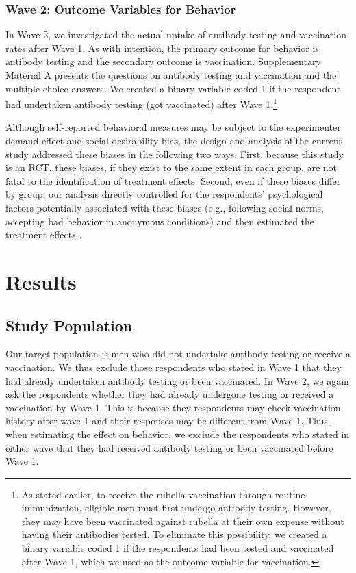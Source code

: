 \documentclass[
  11pt,
  a4paper
]{article}
\begin{document}
\hypertarget{wave2}{%
\subsubsection{Wave 2: Outcome Variables for Behavior}\label{wave2}}

In Wave 2, we investigated the actual uptake of antibody testing and vaccination rates after Wave 1. As with intention, the primary outcome for behavior is antibody testing and the secondary outcome is vaccination. Supplementary Material A presents the questions on antibody testing and vaccination and the multiple-choice answers. We created a binary variable coded 1 if the respondent had undertaken antibody testing (got vaccinated) after Wave 1.\footnote{As stated earlier, to receive the rubella vaccination through routine immunization, eligible men must first undergo antibody testing. However, they may have been vaccinated against rubella at their own expense without having their antibodies tested. To eliminate this possibility, we created a binary variable coded 1 if the respondents had been tested and vaccinated after Wave 1, which we used as the outcome variable for vaccination.}

Although self-reported behavioral measures may be subject to the experimenter demand effect and social desirability bias, the design and analysis of the current study addressed these biases in the following two ways. First, because this study is an RCT, these biases, if they exist to the same extent in each group, are not fatal to the identification of treatment effects. Second, even if these biases differ by group, our analysis directly controlled for the respondents' psychological factors potentially associated with these biases (e.g., following social norms, accepting bad behavior in anonymous conditions) and then estimated the treatment effects .

\hypertarget{results}{%
\section{Results}\label{results}}

\hypertarget{sample}{%
\subsection{Study Population}\label{sample}}

Our target population is men who did not undertake antibody testing or receive a vaccination. We thus exclude those respondents who stated in Wave 1 that they had already undertaken antibody testing or been vaccinated. In Wave 2, we again ask the respondents whether they had already undergone testing or received a vaccination by Wave 1. This is because they respondents may check vaccination history after wave 1 and their responses may be different from Wave 1. Thus, when estimating the effect on behavior, we exclude the respondents who stated in either wave that they had received antibody testing or been vaccinated before Wave 1.
\end{document}

